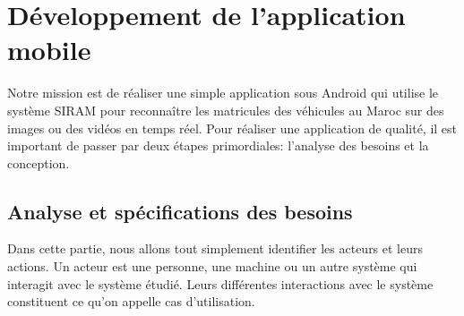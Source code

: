 \section{Développement de l'application mobile}
Notre mission est de réaliser une simple application sous Android qui utilise le système SIRAM pour reconnaître les matricules des véhicules au Maroc sur des images ou des vidéos en temps réel. Pour réaliser une application de qualité, il est important de passer par deux étapes primordiales: l'analyse des besoins et la conception.  
    \subsection{Analyse et spécifications des besoins}
    Dans cette partie, nous allons tout simplement identifier les acteurs et leurs actions. Un acteur est une personne, une machine ou un autre système qui interagit avec le système étudié. Leurs différentes interactions avec le système constituent ce qu'on appelle cas d'utilisation.

